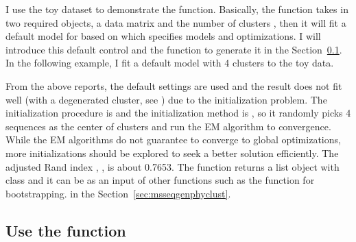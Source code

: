 I use the toy dataset to demonstrate the  function.
Basically, the  function takes in two required objects,
a data matrix  and the number of clusters , then it
will fit a default model for  based on 
which specifies models and optimizations. I will introduce this default
control  and the function  to generate it
in the Section~\ref{sec:emcontrol}.
In the following example, I fit a default model with 4 clusters to the
toy data.

From the above reports, the default settings are used and
the result does not fit well (with a degenerated cluster, see )
due to the initialization problem. The initialization procedure
is  and the initialization method is ,
so it randomly picks 4 sequences as the center of clusters and
run the EM algorithm to convergence. While the EM algorithms do not guarantee
to converge to global optimizations, more initializations should be
explored to seek a better solution efficiently.
The adjusted Rand index \citep{Hubert1985}, , is about 0.7653.
The  function returns a list object with class
{\color{red} }
and it can be as an input of other functions such as the function
 for bootstrapping.
in the Section~\ref{sec:msseqgenphyclust}.




\subsection[Use the .EMControl() function]{Use the  function}
\label{sec:emcontrol}

